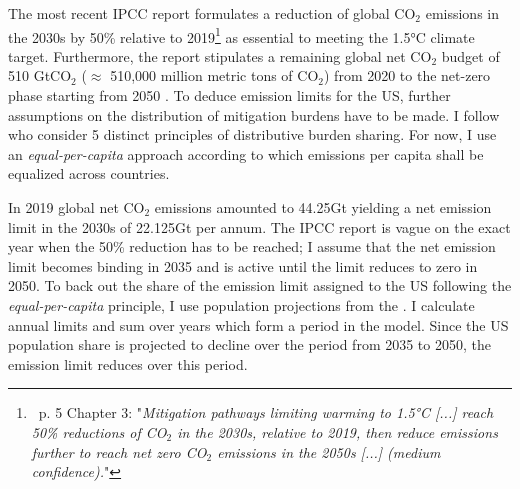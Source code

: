  The most recent IPCC report \citep{IPCC2022} formulates a reduction of global CO$_2$ emissions in the 2030s by 50\% relative to 2019\footnote{\ p. 5 Chapter 3: "\textit{Mitigation pathways limiting warming to 1.5°C [...] reach 50\% reductions of CO$_2$ in the 2030s, relative to 2019, then reduce emissions further to reach net zero CO$_2$ emissions in the 2050s [...] (\textnormal{medium confidence}).}"}  as essential to meeting the 1.5°C climate target.  Furthermore, the report stipulates a remaining global net CO$_2$ budget of 510 GtCO$_2$ ($\approx$ 510,000 million metric tons of CO$_2$) from 2020 to the net-zero phase starting from 2050 \citep[p.5, Chapter3,]{IPCC2022}. 
To deduce emission limits for the US, further assumptions on the distribution of mitigation burdens have to be made. I follow \cite{RobiouDuPont2017EquitableGoals} who consider 5 distinct principles of distributive burden sharing. For now, I use an \textit{equal-per-capita} approach according to which emissions per capita shall be equalized across countries. 
 
% 
 In 2019 global net CO$_2$ emissions amounted to 44.25Gt \citep[compare figure SPM1.a p.11 in ][]{IPCCSPM} yielding a net emission limit in the 2030s of 22.125Gt per annum. The IPCC report is vague on the exact year when the 50\% reduction has to be reached; I assume that the net emission limit becomes binding in 2035 and is active until the limit reduces to zero in 2050. 
 To back out the share of the emission limit assigned to the US following the \textit{equal-per-capita} principle, I use population projections from the \cite{UNPOP}. %
 I calculate annual limits and sum over years which form a period in the model.  Since the US population share is projected to decline over the period from 2035 to 2050, the emission limit reduces over this period. 
 
